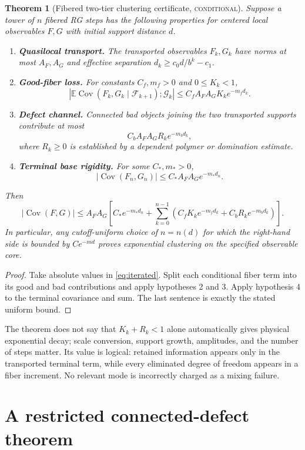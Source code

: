 \documentclass[11pt]{article}
\newcommand{\conditional}{\textcolor{conditionalblue}{\textsc{conditional}}}
\newcommand{\Cov}{\operatorname{Cov}}
\newcommand{\E}{\mathbb E}
\newtheorem{theorem}[definition]{Theorem}
\theoremstyle{remark}
\begin{document}
\begin{theorem}[Fibered two-tier clustering certificate, \conditional]
\label{thm:certificate}
Suppose a tower of $n$ fibered RG steps has the following properties for
centered local observables $F,G$ with initial support distance $d$.
\begin{enumerate}
\item \textbf{Quasilocal transport.}  The transported observables $F_k,G_k$
have norms at most $A_F,A_G$ and effective separation
$d_k\ge c_0d/b^k-c_1$.
\item \textbf{Good-fiber loss.}  For constants $C_f,m_f>0$ and $0\le K_k<1$,
\[
 \left|\E\Cov(F_k,G_k\mid\mathcal F_{k+1});\mathcal G_k\right|
 \le C_f A_FA_G K_k e^{-m_fd_k}.
\]
\item \textbf{Defect channel.}  Connected bad objects joining the two
transported supports contribute at most
\[
 C_bA_FA_G R_k e^{-m_bd_k},
\]
where $R_k\ge0$ is established by a dependent polymer or domination estimate.
\item \textbf{Terminal base rigidity.}  For some $C_*,m_*>0$,
\[
 |\Cov(F_n,G_n)|\le C_*A_FA_Ge^{-m_*d_n}.
\]
\end{enumerate}
Then
\begin{equation}\label{eq:certificate-bound}
 |\Cov(F,G)|\le A_FA_G\left[
 C_*e^{-m_*d_n}+
 \sum_{k=0}^{n-1}(C_fK_k e^{-m_fd_k}+C_bR_ke^{-m_bd_k})
 \right].
\end{equation}
In particular, any cutoff-uniform choice of $n=n(d)$ for which the right-hand
side is bounded by $Ce^{-m d}$ proves exponential clustering on the specified
observable core.
\end{theorem}
\begin{proof}
Take absolute values in \eqref{eq:iterated}.  Split each conditional fiber term
into its good and bad contributions and apply hypotheses 2 and 3.  Apply
hypothesis 4 to the terminal covariance and sum.  The last sentence is exactly
the stated uniform bound.
\end{proof}

The theorem does not say that $K_k+R_k<1$ alone automatically gives physical
exponential decay; scale conversion, support growth, amplitudes, and the number
of steps matter.  Its value is logical: retained information appears only in
the transported terminal term, while every eliminated degree of freedom appears
in a fiber increment.  No relevant mode is incorrectly charged as a mixing
failure.

\section{A restricted connected-defect theorem}
\end{document}
